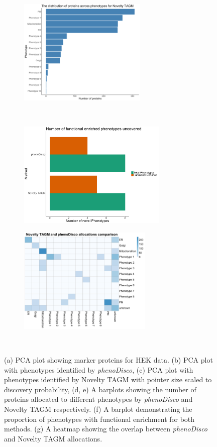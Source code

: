 \documentclass[12pt,english]{article}
\begin{document}
\begin{figure}
\begin{subfigure}[t]{0.5\textwidth}
		\caption{}
	\end{subfigure}
	\begin{subfigure}[t]{0.5\textwidth}
		\centering
		\includegraphics[height=2in]{noveltytagmdist}
		\caption{}
	\end{subfigure}	
~
\begin{subfigure}[t]{0.5\textwidth}
	\centering
	\includegraphics[height=2in]{phenonumhek}
	\caption{}
\end{subfigure}
	\begin{subfigure}[t]{0.5\textwidth}
	\centering
	\includegraphics[height=2in]{hekcompare}
	\caption{}
\end{subfigure}
~
	\caption{(a) PCA plot showing marker proteins for HEK data. (b) PCA plot with phenotypes identified by \textit{phenoDisco}, (c) PCA plot with phenotypes identified by Novelty TAGM with pointer size scaled to discovery probability, (d, e)
	A barplots showing the number of proteins allocated to different phenotypes by \textit{phenoDisco} and Novelty TAGM respectively. (f) A barplot demonstrating the proportion of phenotypes with functional enrichment for both methods. (g) A heatmap showing the overlap between \textit{phenoDisco} and Novelty TAGM allocations.
	}
	\label{figure:phenodisco}
\end{figure}
\clearpage
\end{document}
